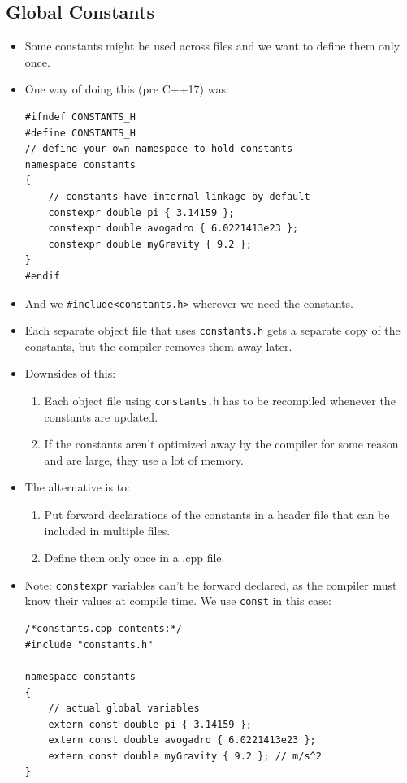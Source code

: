 \documentclass{report}
\begin{document}
\subsection{Global Constants}
\begin{itemize}
\item Some constants might be used across files and we want to define them only once.
\item One way of doing this (pre C++17) was:
\begin{lstlisting}
#ifndef CONSTANTS_H
#define CONSTANTS_H
// define your own namespace to hold constants
namespace constants
{
    // constants have internal linkage by default
    constexpr double pi { 3.14159 };
    constexpr double avogadro { 6.0221413e23 };
    constexpr double myGravity { 9.2 };
}
#endif
\end{lstlisting}
\item And we \texttt{\#include<constants.h>} wherever we need the constants.
\item Each separate object file that uses \texttt{constants.h} gets a separate copy
of the constants, but the compiler removes them away later.
\item Downsides of this:
\begin{enumerate}
\item Each object file using \texttt{constants.h} has to be recompiled whenever the constants are updated.
\item If the constants aren't optimized away by the compiler for some reason and are large,
they use a lot of memory.
\end{enumerate}
\item The alternative is to:
\begin{enumerate}
\item Put forward declarations of the constants in a header file that can be included in multiple files.
\item Define them only once in a .cpp file.
\end{enumerate}
\item Note: \texttt{constexpr} variables can't be forward declared, as the compiler must know their values at compile time. We use \texttt{const} in this case:
\begin{lstlisting}
/*constants.cpp contents:*/
#include "constants.h"

namespace constants
{
    // actual global variables
    extern const double pi { 3.14159 };
    extern const double avogadro { 6.0221413e23 };
    extern const double myGravity { 9.2 }; // m/s^2
}


\end{lstlisting}
\end{itemize}
\end{document}
